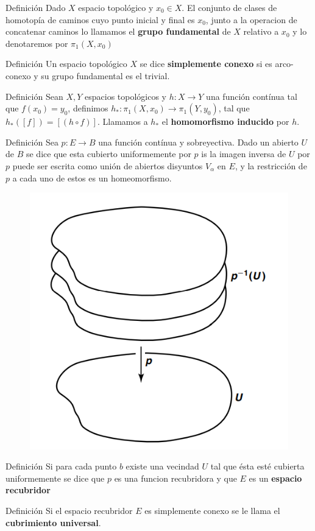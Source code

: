 \documentclass[xcolor=dvipsnames,10pt]{beamer}
\begin{document}
\begin{frame}
    \begin{block}{Definición}
        Dado $X$ espacio topológico y $x_0\in X$. El conjunto de clases de homotopía de caminos cuyo punto inicial y final es $x_0$, junto a la operacion de concatenar caminos lo llamamos el \textbf{grupo fundamental} de $X$ relativo a $x_0$ y lo denotaremos por $\pi_1(X,x_0)$
        \end{block}

        \begin{block}{Definición}
        Un espacio topológico $X$ se dice \textbf{simplemente conexo} si es arco-conexo y su grupo fundamental es el trivial.
        \end{block}  
        \begin{block}{Definición}
            Sean $X,Y$ espacios topológicos y $h: X \rightarrow Y$ una función contínua tal que $f(x_0) = y_0$, definimos $h_*:\pi_1(X,x_0)\rightarrow \pi_1(Y,y_0)$, tal que $h_*([f]) = [(h \circ f)]$. Llamamos a $h_*$ el \textbf{homomorfismo inducido} por $h$.
        \end{block}
\end{frame}
\begin{frame}
    \begin{block}{Definición}
        Sea $p:E\to B$ una función contínua y sobreyectiva. Dado un abierto $U$ de $B$ se dice que esta cubierto uniformemente por $p$ is la imagen inversa de $U$ por $p$ puede ser escrita como unión de abiertos disyuntos $V_\alpha$ en $E$, y la restricción de $p$ a cada uno de estos es un homeomorfismo.
        \end{block} 
        \begin{figure}
            \centering
            \includegraphics[width=0.4\linewidth]{Imagenes/imagen_2025-07-10_120527033.png}
        \end{figure}   
\end{frame}
\begin{frame}
        \begin{block}{Definición}
        Si para cada punto $b$ existe una vecindad $U$ tal que ésta esté cubierta uniformemente se dice que $p$ es una funcion recubridora y que $E$ es un \textbf{espacio recubridor}
        \end{block} 
        \begin{block}{Definición}
            Si el espacio recubridor $E$ es simplemente conexo se le llama el \textbf{cubrimiento universal}.
        \end{block}
        
\end{frame}
\end{document}
